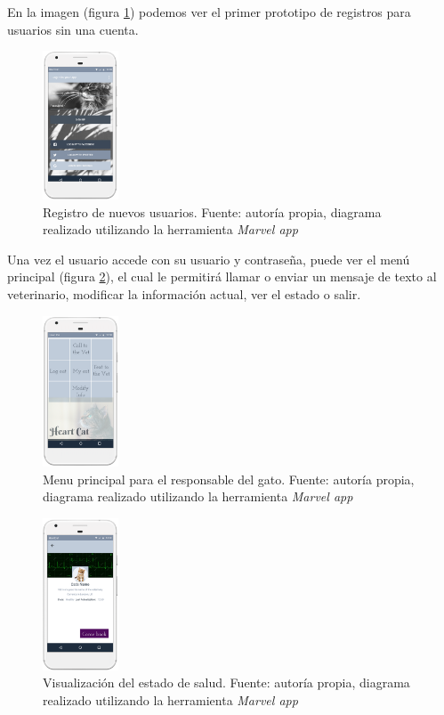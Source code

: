 \documentclass[letterpaper, 10 pt, conference]{ieeeconf}  %
\begin{document}
En la imagen (figura \ref{fig:signup}) podemos ver el primer prototipo de registros para usuarios sin una cuenta.\\

\begin{figure}
\centering
\includegraphics[width=0.2\textwidth]{hc3.PNG}
\caption{Registro de nuevos usuarios. Fuente: autor\'ia propia, diagrama realizado utilizando la herramienta \textit{Marvel app}}
\label{fig:signup}
\end{figure}

Una vez el usuario accede con su usuario y contrase\~na, puede ver el men\'u principal (figura \ref{fig:menu}), el cual le permitir\'a llamar o enviar un mensaje de texto al veterinario, modificar la informaci\'on actual, ver el estado o salir.\\

\begin{figure}
\centering
\includegraphics[width=0.2\textwidth]{hc4.PNG}
\caption{Menu principal para el responsable del gato. Fuente: autor\'ia propia, diagrama realizado utilizando la herramienta \textit{Marvel app}}
\label{fig:menu}
\end{figure}

\begin{figure}
\centering
\includegraphics[width=0.2\textwidth]{HC5.PNG}
\caption{Visualizaci\'on del estado de salud. Fuente: autor\'ia propia, diagrama realizado utilizando la herramienta \textit{Marvel app}}
\label{fig:viewingHeart}
\end{figure}
\end{document}
